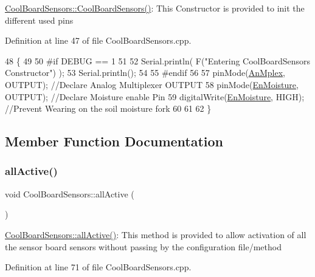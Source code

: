 \hyperlink{class_cool_board_sensors_a91ff2a02f5486f90cf2413a1cf8a9ed4}{Cool\+Board\+Sensors\+::\+Cool\+Board\+Sensors()}\+: This Constructor is provided to init the different used pins 

Definition at line 47 of file Cool\+Board\+Sensors.\+cpp.


\begin{DoxyCode}
48 \{
49 
50 \textcolor{preprocessor}{#if DEBUG == 1}
51 
52     Serial.println( F(\textcolor{stringliteral}{"Entering CoolBoardSensors Constructor"}) );
53     Serial.println();
54 
55 \textcolor{preprocessor}{#endif}
56     
57     pinMode(\hyperlink{class_cool_board_sensors_a12ef28b1046219e0aee10bf64e28c4a5}{AnMplex}, OUTPUT);                \textcolor{comment}{//Declare Analog Multiplexer OUTPUT}
58     pinMode(\hyperlink{class_cool_board_sensors_a6177d02e14a057a2f171a2e930b5038d}{EnMoisture}, OUTPUT);             \textcolor{comment}{//Declare Moisture enable Pin}
59     digitalWrite(\hyperlink{class_cool_board_sensors_a6177d02e14a057a2f171a2e930b5038d}{EnMoisture}, HIGH);            \textcolor{comment}{//Prevent Wearing on the soil moisture fork}
60 
61 
62 \}
\end{DoxyCode}


\subsection{Member Function Documentation}
\mbox{\label{class_cool_board_sensors_aa432c5aac88f89c31a10766390f23e0b}} 
\subsubsection{\texorpdfstring{all\+Active()}{allActive()}}
{\footnotesize\ttfamily void Cool\+Board\+Sensors\+::all\+Active (\begin{DoxyParamCaption}{ }\end{DoxyParamCaption})}

\hyperlink{class_cool_board_sensors_aa432c5aac88f89c31a10766390f23e0b}{Cool\+Board\+Sensors\+::all\+Active()}\+: This method is provided to allow activation of all the sensor board sensors without passing by the configuration file/method 

Definition at line 71 of file Cool\+Board\+Sensors.\+cpp.


